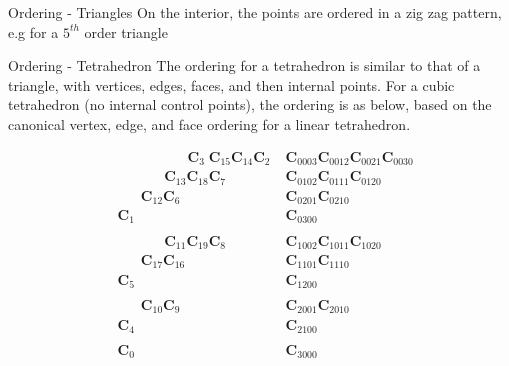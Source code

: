 \documentclass[12pt]{beamer}
\begin{document}
\begin{frame}{Ordering - Triangles}
On the interior, the points are ordered in a zig zag pattern, e.g for a $5^{th}$ order triangle
\begin{figure}
\centering
{}
\end{figure}
\end{frame}
\begin{frame}{Ordering - Tetrahedron}
The ordering for a tetrahedron is similar to that of a triangle, with vertices, edges, faces, and then internal points. For a cubic tetrahedron (no internal control points), the ordering is as below, based on the canonical vertex, edge, and face ordering for a linear tetrahedron.
{
  \scriptsize

\begin{eqnarray*}
&\;\;\;\;\;\;\;\;\;\;\;\;\;\;\;\;\;\;\mathbf{C}_{3}\;\mathbf{C}_{15}\mathbf{C}_{14}\mathbf{C}_{2}\;&\mathbf{C}_{0003}\mathbf{C}_{0012}\mathbf{C}_{0021}\mathbf{C}_{0030}\\
&\;\;\;\;\;\;\;\;\;\;\;\;\mathbf{C}_{13}\mathbf{C}_{18}\mathbf{C}_{7}\;&\mathbf{C}_{0102}\mathbf{C}_{0111}\mathbf{C}_{0120}\\
&\;\;\;\;\;\;\mathbf{C}_{12}\mathbf{C}_{6}\;&\mathbf{C}_{0201}\mathbf{C}_{0210}\\
&\mathbf{C}_{1}\;&\mathbf{C}_{0300}\\
\\
&\;\;\;\;\;\;\;\;\;\;\;\;\mathbf{C}_{11}\mathbf{C}_{19}\mathbf{C}_{8}\;&\mathbf{C}_{1002}\mathbf{C}_{1011}\mathbf{C}_{1020}\\
&\;\;\;\;\;\;\mathbf{C}_{17}\mathbf{C}_{16}&\mathbf{C}_{1101}\mathbf{C}_{1110}\\
&\mathbf{C}_{5}\;&\mathbf{C}_{1200}\\
\\
&\;\;\;\;\;\;\mathbf{C}_{10}\mathbf{C}_{9}\;&\mathbf{C}_{2001}\mathbf{C}_{2010}\\
&\mathbf{C}_{4}\;&\mathbf{C}_{2100}\\
\\
&\mathbf{C}_{0}\;&\mathbf{C}_{3000}\\
\\
\end{eqnarray*}
}
\end{frame}
\end{document}
